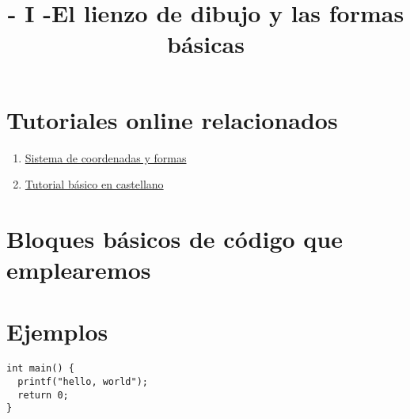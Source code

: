 \documentclass[14pt,a4paper,oneside]{article}
\title{- I -\linebreak El lienzo de dibujo y las formas básicas}
\author{}
\date{}
\begin{document}
\maketitle

\section{Tutoriales online relacionados}

\begin{enumerate}
   \item \href{http://processing.org/learning/drawing/}{Sistema de coordenadas y formas} 
   \item \href{http://go.yuri.at/p5/tutorial/}{Tutorial básico en castellano}
\end{enumerate}

\section{Bloques básicos de código que emplearemos}


\section{Ejemplos}

\begin{verbatim}
int main() {
  printf("hello, world");
  return 0;
}
\end{verbatim}
\end{document}
